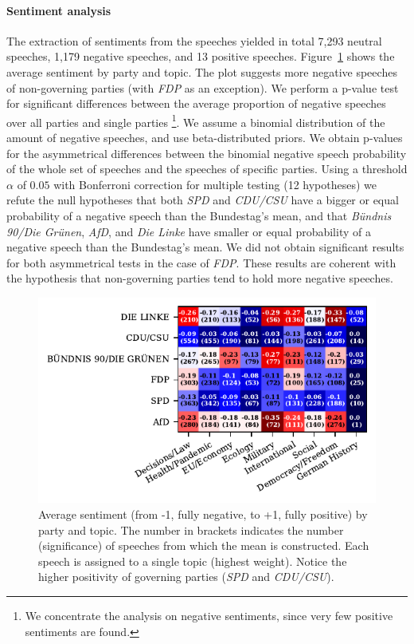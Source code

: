 \documentclass{article}
\begin{document}
\paragraph{Sentiment analysis}
The extraction of sentiments from the speeches yielded in total 7,293 neutral speeches, 1,179 negative speeches, and 13 positive speeches.
Figure~\ref{sentiments_plot} shows the average sentiment by party and topic.
The plot suggests more negative speeches of non-governing parties (with \textit{FDP} as an exception).
We perform a p-value test for significant differences between the average proportion of negative speeches over all parties and single parties
\footnote{We concentrate the analysis on negative sentiments, since very few positive sentiments are found.}.
We assume a binomial distribution of the amount of negative speeches, and use beta-distributed priors.
We obtain p-values for the asymmetrical differences between the binomial negative speech probability of the whole set of speeches and the speeches of specific parties.
Using a threshold $\alpha$ of $0.05$ with Bonferroni correction for multiple testing (12 hypotheses)
we refute the null hypotheses that both \textit{SPD} and \textit{CDU/CSU} have a bigger or equal probability of a negative speech than the Bundestag's mean,
and that \textit{Bündnis 90/Die Grünen}, \textit{AfD}, and \textit{Die Linke} have smaller or equal probability of a negative speech than the Bundestag's mean.
We did not obtain significant results for both asymmetrical tests in the case of \textit{FDP}.
These results are coherent with the hypothesis that non-governing parties tend to hold more negative speeches.

\begin{figure}
  \centering
  \includegraphics[width=0.9\linewidth]{images/sentiments_confusion.pdf}
  \captionsetup{width=0.9\linewidth}
  \caption{
    Average sentiment (from -1, fully negative, to +1, fully positive) by party and topic.
    The number in brackets indicates the number (significance) of speeches from which the mean is constructed.
    Each speech is assigned to a single topic (highest weight).
    Notice the higher positivity of governing parties (\textit{SPD} and \textit{CDU/CSU}).
  }
  \label{sentiments_plot}
\end{figure}
\end{document}
